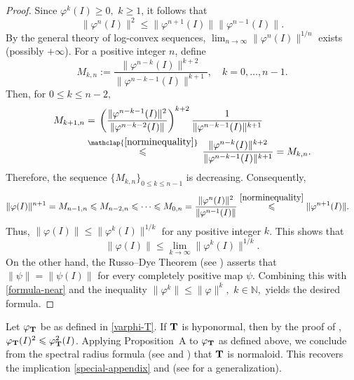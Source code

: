 \documentclass[10pt, a4paper, oneside, reqno]{amsproc}
\numberwithin{equation}{section}
\theoremstyle{remark}
\theoremstyle{definition}
\newcommand*{\Ge}{\geqslant}
\newcommand*{\Le}{\leqslant}
\begin{document}
\begin{proof}
Since $\varphi^k(I) \Ge 0,$ $k \Ge 1$, it follows that \begin{equation} \label{norminequality}
	\|\varphi^n(I)\|^2 \Le \|\varphi^{n+1}(I)\|\|\varphi^{n-1}(I)\|.
	\end{equation}
By the general theory of log-convex sequences, $\lim_{n \rightarrow \infty}\|\varphi^n(I)\|^{1/n}$ exists (possibly $+\infty$).
For a positive integer $n$, define \[M_{k, n} := \frac{\|\varphi^{n-k}(I)\|^{k+2}}{\|\varphi^{n-k-1}(I)\|^{k+1}}, \quad k= 0, \ldots, n-1.\] Then, for $0 \Le k \Le n-2,$ 
\begin{align*}
M_{k+1, n} &=
\, \left(\frac{\|\varphi^{n-k-1}(I)\|^{2}}{\|\varphi^{n-k-2}(I)\|}\right)^{k+2}  \frac{1}{\|\varphi^{n-k-1}(I)\|^{k+1}} \\
&\stackrel{\mathclap{\eqref{norminequality}}}{\Le} \, \frac{\|\varphi^{n-k}(I)\|^{k+2}}{\|\varphi^{n-k-1}(I)\|^{k+1}} = M_{k, n}.
\end{align*} 
Therefore, the sequence $\{M_{k, n}\}_{0 \Le k \Le n-1}$ is decreasing. Consequently, 
\begin{align*}
\|\varphi(I)\|^{n+1} &= M_{n-1, n} \Le M_{n-2, n} \Le \cdots \Le M_{0, n} 
= \frac{\|\varphi^{n}(I)\|^2}{\|\varphi^{n-1}(I)\|} \overset{\eqref{norminequality}}\Le \|\varphi^{n+1}(I)\|.
\end{align*}
Thus, $\|\varphi(I)\| \Le \|\varphi^k(I)\|^{1/k}$ for any positive integer $k$. 
This shows that 
\begin{equation} \label{formula-near}
 \|\varphi(I)\| \Le \lim_{k \to \infty} \|\varphi^k(I)\|^{1/k}. 
\end{equation}
On the other hand, the Russo--Dye Theorem (see \cite[Corollary 2.9]{P2003}) asserts that $\|\psi\| =\|\psi(I)\|$ for every completely positive map $\psi$. Combining this with \eqref{formula-near} and the inequality $\|\varphi^k\| \Le \|\varphi\|^k,$ $k \in \mathbb N,$ yields the desired formula. 
\end{proof}
Let $\varphi_{\bf T}$ be as defined in \eqref{varphi-T}.
If ${\bf T}$ is hyponormal, then by the proof of \cite[Lemma~3.10]{CS2017},  
$\varphi_{\bf T}(I)^2 \Le \varphi^2_{\bf T}(I)$.
Applying Proposition~A to $\varphi_{\bf T}$ as defined above, we conclude from the spectral radius formula (see  \cite[Theorem~1]{CZ1992} and \cite[Theorem~1]{MS1992}) that ${\bf T}$ is normaloid. This recovers the implication \eqref{special-appendix} and \cite[Lemma~3.10]{CS2017} (see \cite[Theorem~3.5]{S2025} for a generalization). 
\end{document}

